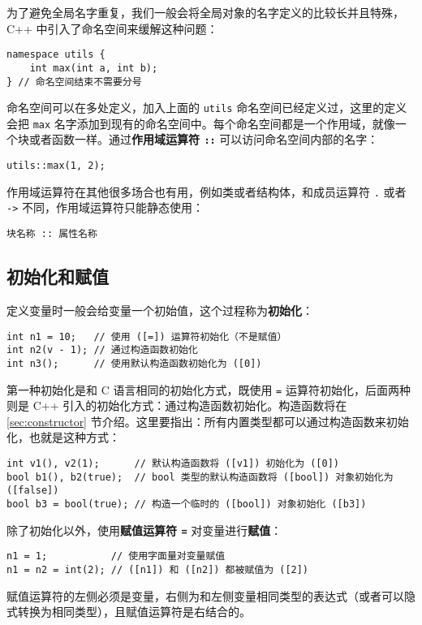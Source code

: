 \documentclass[hyperref,UTF8]{article}
\begin{document}
为了避免全局名字重复，我们一般会将全局对象的名字定义的比较长并且特殊，C++ 中引入了命名空间来缓解这种问题：
\begin{lstlisting}
namespace utils {
    int max(int a, int b);
} // 命名空间结束不需要分号
\end{lstlisting}
命名空间可以在多处定义，加入上面的 \texttt{utils} 命名空间已经定义过，这里的定义会把 \texttt{max} 名字添加到现有的命名空间中。每个命名空间都是一个作用域，就像一个块或者函数一样。通过\textbf{作用域运算符 \texttt{::}} 可以访问命名空间内部的名字：
\begin{lstlisting}[numbers=none]
utils::max(1, 2);
\end{lstlisting}
作用域运算符在其他很多场合也有用，例如类或者结构体，和成员运算符 \texttt{.} 或者 \texttt{->} 不同，作用域运算符只能静态使用：
\begin{lstlisting}[numbers=none]
块名称 :: 属性名称
\end{lstlisting}

\subsection{初始化和赋值}

定义变量时一般会给变量一个初始值，这个过程称为\textbf{初始化}：
\begin{lstlisting}
int n1 = 10;   // 使用 ([=]) 运算符初始化（不是赋值）
int n2(v - 1); // 通过构造函数初始化
int n3();      // 使用默认构造函数初始化为 ([0])
\end{lstlisting}
第一种初始化是和 C 语言相同的初始化方式，既使用 \texttt{=} 运算符初始化，后面两种则是 C++ 引入的初始化方式：通过构造函数初始化。构造函数将在 \ref{sec:constructor} 节介绍。这里要指出：所有内置类型都可以通过构造函数来初始化，也就是这种方式：
\begin{lstlisting}
int v1(), v2(1);      // 默认构造函数将 ([v1]) 初始化为 ([0])
bool b1(), b2(true);  // bool 类型的默认构造函数将 ([bool]) 对象初始化为 ([false])
bool b3 = bool(true); // 构造一个临时的 ([bool]) 对象初始化 ([b3])
\end{lstlisting}

除了初始化以外，使用\textbf{赋值运算符 \texttt{=}} 对变量进行\textbf{赋值}：
\begin{lstlisting}
n1 = 1;           // 使用字面量对变量赋值
n1 = n2 = int(2); // ([n1]) 和 ([n2]) 都被赋值为 ([2])
\end{lstlisting}
赋值运算符的左侧必须是变量，右侧为和左侧变量相同类型的表达式（或者可以隐式转换为相同类型），且赋值运算符是右结合的。
\end{document}
